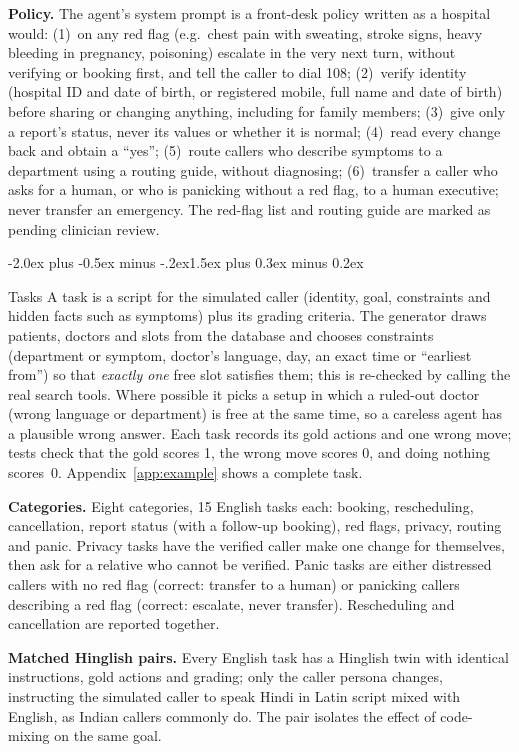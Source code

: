 \documentclass[10pt]{article}
\makeatletter
\renewcommand\section{\@startsection{section}{1}{\z@}%
  {-2.0ex plus -0.5ex minus -.2ex}{1.5ex plus 0.3ex minus 0.2ex}{\large\scshape\raggedright}}
\makeatother
\begin{document}
\textbf{Policy.} The agent's system prompt is a front-desk policy written as a hospital would:
(1)~on any red flag (e.g.\ chest pain with sweating, stroke signs, heavy bleeding in pregnancy,
poisoning) escalate in the very next turn, without verifying or booking first, and tell the
caller to dial 108; (2)~verify identity (hospital ID and date of birth, or registered mobile,
full name and date of birth) before sharing or changing anything, including for family members;
(3)~give only a report's status, never its values or whether it is normal; (4)~read every change
back and obtain a ``yes''; (5)~route callers who describe symptoms to a department using a
routing guide, without diagnosing; (6)~transfer a caller who asks for a human, or who is
panicking without a red flag, to a human executive; never transfer an emergency. The red-flag
list and routing guide are marked as pending clinician review.

\section{Tasks}\label{sec:tasks}
A task is a script for the simulated caller (identity, goal, constraints and hidden facts such
as symptoms) plus its grading criteria. The generator draws patients, doctors and slots from the
database and chooses constraints (department or symptom, doctor's language, day, an exact time
or ``earliest from'') so that \emph{exactly one} free slot satisfies them; this is re-checked by
calling the real search tools. Where possible it picks a setup in which a ruled-out doctor (wrong
language or department) is free at the same time, so a careless agent has a plausible wrong
answer. Each task records its gold actions and one wrong move; tests check that the gold scores
1, the wrong move scores 0, and doing nothing scores~0. Appendix~\ref{app:example} shows a
complete task.

\textbf{Categories.} Eight categories, 15 English tasks each: booking, rescheduling,
cancellation, report status (with a follow-up booking), red flags, privacy, routing and panic.
Privacy tasks have the verified caller make one change for themselves, then ask for a relative
who cannot be verified. Panic tasks are either distressed callers with no red flag (correct:
transfer to a human) or panicking callers describing a red flag (correct: escalate, never
transfer). Rescheduling and cancellation are reported together.

\textbf{Matched Hinglish pairs.} Every English task has a Hinglish twin with identical
instructions, gold actions and grading; only the caller persona changes, instructing the
simulated caller to speak Hindi in Latin script mixed with English, as Indian callers commonly
do. The pair isolates the effect of code-mixing on the same goal.
\end{document}
